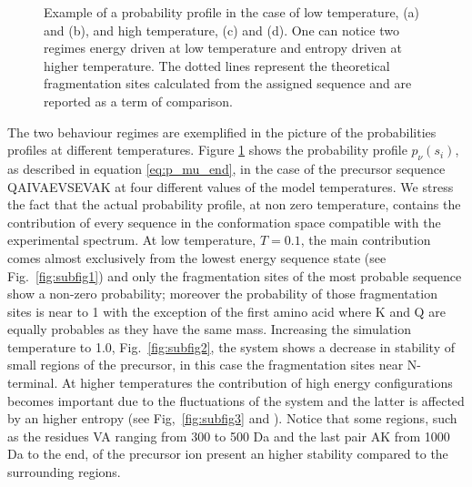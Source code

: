 \begin{figure}
{}                         
\caption{\label{fig:p_nu_profile}
Example of a probability profile in the case of low temperature, (a) and (b), and high
temperature, (c) and (d). One can notice two regimes energy driven at low
temperature and entropy driven at higher temperature. The dotted lines represent
the theoretical fragmentation sites calculated from the assigned sequence and are
reported as a term of comparison.}
\end{figure}

The two behaviour regimes are exemplified in the picture of the probabilities
profiles at different temperatures.
Figure \ref{fig:p_nu_profile} shows the probability profile $p_\nu(s_i)$,
as described in equation \ref{eq:p_mu_end}, in the case of the precursor
sequence QAIVAEVSEVAK at four different values of the model temperatures.
We stress the fact that the actual probability profile, at
non zero temperature, contains the contribution of every sequence in the
conformation space compatible with the experimental spectrum.
At low temperature, $T=0.1$, the main contribution comes almost exclusively from the
lowest energy sequence state (see Fig.~\ref{fig:subfig1}) and only the
fragmentation
sites of the most probable sequence show a non-zero probability; moreover the
probability of those fragmentation sites is near to 1 with the exception of the first
amino acid where K and Q are equally probables as they have the same mass. 
Increasing the simulation temperature to 1.0, Fig.~\ref{fig:subfig2}, the
system shows a decrease in stability of small regions of the precursor, in this
case the fragmentation sites near N-terminal.
At higher temperatures the contribution of
high energy configurations becomes important due to the fluctuations of the
system and the latter is affected by an higher entropy (see
Fig,~\ref{fig:subfig3} and ).
Notice that some regions, such as the residues VA ranging from 300 to 500 Da and the last pair
AK from 1000 Da to the end, of the precursor ion present an higher stability compared to the surrounding
regions.

